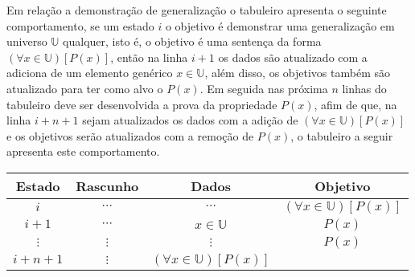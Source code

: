 Em relação a demonstração de generalização o tabuleiro apresenta o seguinte comportamento, se um estado $i$ o objetivo é demonstrar uma generalização em universo $\mathbb{U}$ qualquer, isto é, o objetivo é uma sentença da forma $(\forall x \in \mathbb{U})[P(x)]$, então na linha $i+1$ os dados são atualizado com a adiciona de um elemento genérico $x \in \mathbb{U}$, além disso, os objetivos também são atualizado para ter como alvo o $P(x)$. Em seguida nas próxima $n$ linhas do tabuleiro deve ser desenvolvida a prova da propriedade $P(x)$, afim de que, na linha $i+n+1$ sejam atualizados os dados com a adição de $(\forall x \in \mathbb{U})[P(x)]$ e os objetivos serão atualizados com a remoção de $P(x)$, o tabuleiro a seguir apresenta este comportamento.

\begin{table*}[h]
	\centering
	\begin{tabular}{c|c|c|c}
		\hline
		\rowcolor{cinzaClaro}
		Estado & Rascunho & Dados & Objetivo\\
		\hline
		$i$ & $\cdots$ & $\cdots$ & $(\forall x \in \mathbb{U})[P(x)]$\\
		$i+1$ & $\cdots$ & $x \in \mathbb{U}$ & $P(x)$\\
		$\vdots$ & $\vdots$ & $\vdots$ & $P(x)$\\
		$i+n+1$ & $\vdots$ & $(\forall x \in \mathbb{U})[P(x)]$ & \\
		\hline 
	\end{tabular}
\end{table*}

